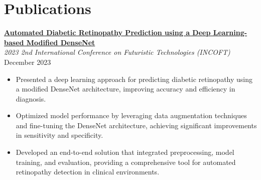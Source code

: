 \documentclass[letterpaper,11pt]{article}
\begin{document}
\section*{Publications}
\textbf{\href{https://ieeexplore.ieee.org/document/10425652}{Automated Diabetic Retinopathy Prediction using a Deep Learning-based Modified DenseNet}} \\
\emph{2023 2nd International Conference on Futuristic Technologies (INCOFT)} \hfill December 2023
\begin{itemize}
    \item Presented a deep learning approach for predicting diabetic retinopathy using a modified DenseNet architecture, improving accuracy and efficiency in diagnosis.
    \item Optimized model performance by leveraging data augmentation techniques and fine-tuning the DenseNet architecture, achieving significant improvements in sensitivity and specificity.
    \item Developed an end-to-end solution that integrated preprocessing, model training, and evaluation, providing a comprehensive tool for automated retinopathy detection in clinical environments.
\end{itemize}
\end{document}
